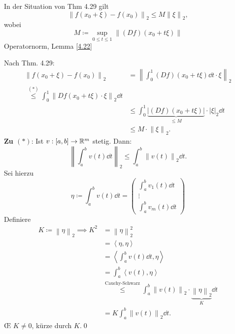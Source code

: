 \begin{theorem}[Schrankensatz]
	In der Situation von Thm 4.29 gilt
	\[
		\left\| f(x_0 + \xi) - f(x_0) \right\| _2 \leq M \left\| \xi \right\| _2, 
	\]
	wobei
	\[
		M \coloneqq  \sup_{0 \leq t \leq 1}  \left\| \left( Df \right) \left( x_0 + t \xi \right)  \right\| 
	\]
	Operatornorm, Lemma \ref{4.22}
\end{theorem}
\begin{proof*}
	Nach Thm. 4.29:
	\begin{align*}
		\left\| f(x_0 + \xi) - f(x_0) \right\| _2 &= \left\| \int_{0}^{1} \left( Df \right) \left( x_0 + t\xi \right) \dd t \cdot \xi \right\| _2 \\
		~ \overset{(*)}{\leq } \int_{0}^{1} \left\| Df (x_0 + t\xi) \cdot \xi \right\| _2 \dd t \\
		~ & \leq \int_{0}^{1} \underbrace{\left| (Df) (x_0 + t\xi) \right| }_{\leq M} \cdot \left| \xi \right| _2 \dd t \\
		~ & \leq M \cdot \left\| \xi \right\| _2.
	\end{align*}
	\textbf{Zu $ (*) $}: Ist $ v : [a, b] \to \mathbb{R} ^m $ stetig.
	Dann:
	\[
		\left\| \int_{a}^{b} v(t) \dd t \right\| _{2} \leq \int_{a}^{b} \left\| v(t) \right\| _2 \dd t.
	\]
	Sei hierzu
	\[
		\eta \coloneqq \int_{a}^{b} v(t) \dd t = \begin{pmatrix} \int_{a}^{b} v_1(t) \dd t \\ \vdots \\ \int_{a}^{b} v_m (t) \dd t \end{pmatrix} 
	\]
	Definiere
	\begin{align*}
		K \coloneqq \left\| \eta \right\| _2 \implies K^2 &= \left\| \eta \right\| _2^2 \\
		~ &= \left< \eta, \eta \right> \\
		~ &= \left< \int_{a}^{b} v(t) \dd t, \eta \right> \\
		  &= \int_{a}^{b} \left< v(t), \eta \right> \\
		  & \overset{\text{Cauchy-Schwarz} }{\leq } \int_{a}^{b} \left\| v(t) \right\| _2 \cdot \underbrace{\left\| \eta \right\| _2}_{K} \dd t \\
		  &= K \int_{a}^{b}\left\| v(t) \right\| _2 \dd t.
	\end{align*}
	\OE{} $ K \neq 0 $, kürze durch $ K $.\qed
\end{proof*}

